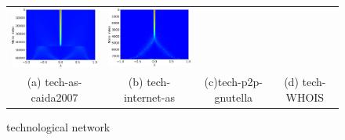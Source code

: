 \documentclass[senior,final,11pt]{iscs-thesis}
\begin{document}
\begin{figure}[htbp]
\begin{tabular}{cccc}
    \includegraphics[width=45mm]{figure/tech-p2p-gnutellamtx_pdos.png} &
    \includegraphics[width=45mm]{figure/tech-WHOISmtx_pdos.png} \\
    (a) tech-as-caida2007 & (b) tech-internet-as & (c)tech-p2p-gnutella  & (d) tech-WHOIS\\ [6pt]
  \end{tabular}
  \caption{technological network }
  \label{fig:technological  }
\end{figure}
\end{document}
